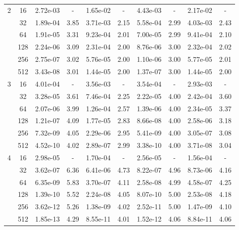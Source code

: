 \begin{table}[htbp]
\begin{center}
\begin{tabular}{| c | c | c c | c c | c c | c c |}
			\hline

			2	& 16 & 2.72e-03 & - & 1.65e-02 & - & 4.43e-03 & - & 2.17e-02 & - \\
				& 32 & 1.89e-04 & 3.85 & 3.71e-03 & 2.15 & 5.58e-04 & 2.99 & 4.03e-03 & 2.43 \\
				& 64 & 1.91e-05 & 3.31 & 9.23e-04 & 2.01 & 7.00e-05 & 2.99 & 9.41e-04 & 2.10 \\
				& 128 & 2.24e-06 & 3.09 & 2.31e-04 & 2.00 & 8.76e-06 & 3.00 & 2.32e-04 & 2.02 \\
				& 256 & 2.75e-07 & 3.02 & 5.76e-05 & 2.00 & 1.10e-06 & 3.00 & 5.77e-05 & 2.01 \\
				& 512 & 3.43e-08 & 3.01 & 1.44e-05 & 2.00 & 1.37e-07 & 3.00 & 1.44e-05 & 2.00 \\

			\hline

			3	& 16 & 4.01e-04 & - & 3.56e-03 & - & 3.54e-04 & - & 2.93e-03 & - \\
				& 32 & 3.28e-05 & 3.61 & 7.46e-04 & 2.25 & 2.22e-05 & 4.00 & 2.42e-04 & 3.60 \\
				& 64 & 2.07e-06 & 3.99 & 1.26e-04 & 2.57 & 1.39e-06 & 4.00 & 2.34e-05 & 3.37 \\
				& 128 & 1.21e-07 & 4.09 & 1.77e-05 & 2.83 & 8.66e-08 & 4.00 & 2.58e-06 & 3.18 \\
				& 256 & 7.32e-09 & 4.05 & 2.29e-06 & 2.95 & 5.41e-09 & 4.00 & 3.05e-07 & 3.08 \\
				& 512 & 4.52e-10 & 4.02 & 2.89e-07 & 2.99 & 3.38e-10 & 4.00 & 3.71e-08 & 3.04 \\

			\hline

			4	& 16 & 2.98e-05 & - & 1.70e-04 & - & 2.56e-05 & - & 1.56e-04 & - \\
				& 32 & 3.62e-07 & 6.36 & 6.41e-06 & 4.73 & 8.22e-07 & 4.96 & 8.73e-06 & 4.16 \\
				& 64 & 6.35e-09 & 5.83 & 3.70e-07 & 4.11 & 2.58e-08 & 4.99 & 4.58e-07 & 4.25 \\
				& 128 & 1.39e-10 & 5.52 & 2.24e-08 & 4.05 & 8.07e-10 & 5.00 & 2.53e-08 & 4.18 \\
				& 256 & 3.62e-12 & 5.26 & 1.38e-09 & 4.02 & 2.52e-11 & 5.00 & 1.47e-09 & 4.10 \\
				& 512 & 1.85e-13 & 4.29 & 8.55e-11 & 4.01 & 1.52e-12 & 4.06 & 8.84e-11 & 4.06 \\

			\hline
		\end{tabular}
	\end{center}
\end{table}

